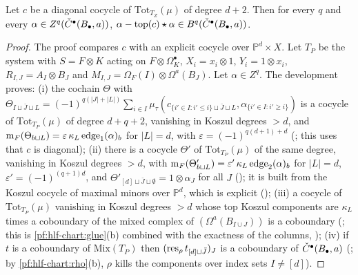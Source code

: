 \begin{lemma}\label{pf:hlf-chart:zact}
Let $c$ be a diagonal cocycle of $\mathrm{Tot}_{T_Z}(\mu)$ of degree $d+2$. Then for every $q$ and every $\alpha\in Z^q(\check{C}^\bullet(B_\bullet,a))$,
$\alpha-\mathrm{top}(c)\star\alpha\in B^q(\check{C}^\bullet(B_\bullet,a))$.
\end{lemma}

\begin{proof}
The proof compares $c$ with an explicit cocycle over $\mathbb P^d\times X$. Let $T_P$ be the system with $S=F\otimes K$ acting on $F\otimes\Omega^\bullet_K$,
$X_i=x_i\otimes1$, $Y_i=1\otimes x_i$, $R_{I,J}=A_I\otimes B_J$ and $M_{I,J}=\Omega_F(I)\otimes\Omega^a(B_J)$. Let $\alpha\in Z^q$. The development
proves:
(i) the cochain $\Theta$ with
$\Theta_{I\sqcup\bar J\sqcup L}=(-1)^{q(|J|+|L|)}\sum_{i\in I}\mu_\tau(c_{\{i'\in I:i'\le i\}\sqcup\bar J\sqcup L},\alpha_{\{i'\in I:i'\ge i\}})$
is a cocycle of $\mathrm{Tot}_{T_P}(\mu)$ of degree $d+q+2$, vanishing in Koszul degrees $>d$, and $\operatorname{m}_F(\Theta_{b\sqcup L})=
\varepsilon\,\kappa_L\,\mathrm{edge}_1(\alpha)_b$ for $|L|=d$, with $\varepsilon=(-1)^{q(d+1)+d}$ (;
this uses that $c$ is diagonal);
(ii) there is a cocycle $\Theta'$ of $\mathrm{Tot}_{T_P}(\mu)$ of the same degree, vanishing in Koszul degrees $>d$, with
$\operatorname{m}_F(\Theta'_{b\sqcup L})=\varepsilon'\,\kappa_L\,\mathrm{edge}_2(\alpha)_b$ for $|L|=d$, $\varepsilon'=(-1)^{(q+1)d}$, and
$\Theta'_{[d]\sqcup\bar J\sqcup\emptyset}=1\otimes\alpha_J$ for all $J$ (); it is built from
the Koszul cocycle of maximal minors over $\mathbb P^d$, which is explicit ();
(iii) a cocycle of $\mathrm{Tot}_{T_P}(\mu)$ vanishing in Koszul degrees $>d$ whose top Koszul components are $\kappa_L$ times a coboundary of the
mixed complex of $(\Omega^a(B_{I\cup J}))$ is a coboundary (; this is
\cref{pf:hlf-chart:glue}(b) combined with the exactness of the columns, );
(iv) if $t$ is a coboundary of $\mathrm{Mix}(T_P)$ then $(\operatorname{res}_\rho t_{[d]\sqcup\bar J})_J$ is a coboundary of $\check{C}^\bullet(B_\bullet,a)$
(; by \cref{pf:hlf-chart:rho}(b), $\rho$ kills the components over index sets $I\ne[d]$).


\end{proof}
